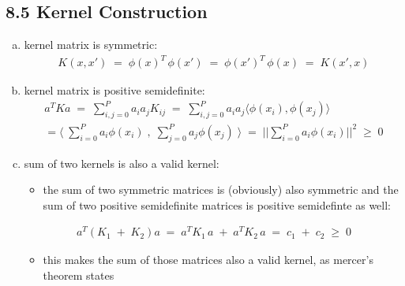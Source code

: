 \documentclass[10pt,a4paper]{article}
\begin{document}
\subsection*{8.5 Kernel Construction}
\begin{enumerate}[a)]
\item kernel matrix is symmetric:
\begin{eqnarray}
K(x,x')\;=\;\phi(x)^T\,\phi(x')\;=\;\phi(x')^T\,\phi(x)\;=\;K(x',x)
\end{eqnarray}
\item kernel matrix is positive semidefinite:
\begin{eqnarray}
a^T K a\;=\;\sum^P_{i,j=0} a_i a_j K_{ij}\;=\;\sum^P_{i,j=0}a_i a_j \langle \phi(x_i), \phi(x_j) \rangle \\
= \langle\; \sum^P_{i=0}a_i \phi(x_i) \;,\; \sum^P_{j=0} a_j \phi(x_j)\;\rangle \;=\; || \sum_{i=0}^P a_i \phi(x_i) ||^2 \;\geq\;0
\end{eqnarray}
\item sum of two kernels is also a valid kernel:
\begin{itemize}
\item the sum of two symmetric matrices is (obviously) also symmetric and the sum of two positive semidefinite matrices is positive semidefinte as well:
\end{itemize}
\begin{eqnarray}
a^T (K_1\;+\;K_2) a\;=\;a^T K_1 \,a\;+\;a^T K_2 \,a\;=\;c_1\;+\;c_2\;\geq\;0
\end{eqnarray}
\begin{itemize}
\item this makes the sum of those matrices also a valid kernel, as mercer's theorem states
\end{itemize}
\end{enumerate}
\end{document}
